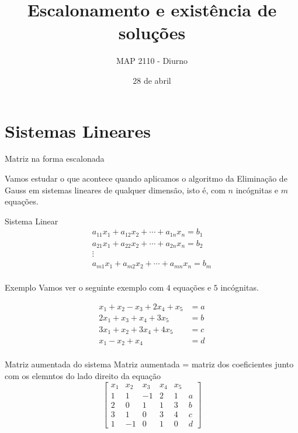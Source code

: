 \documentclass{beamer}
\title[Escalonamento]{Escalonamento e existência de soluções}
\author{MAP 2110 - Diurno}
\institute{IME USP}
\date{28 de abril}
\begin{document}
\begin{frame}
  \titlepage
\end{frame}



\section{Sistemas Lineares}

\begin{frame}{Matriz na forma escalonada}

 Vamos estudar o que acontece quando aplicamos o algoritmo da Eliminação de Gauss em sistemas
 lineares de qualquer dimensão, isto é, com $n$ incógnitas e $m$ equações.
   \begin{block}{Sistema Linear}
     \begin{gather*}
      a_{11}x_1 + a_{12}x_2 + \cdots + a_{1n}x_n = b_1 \\
      a_{21}x_1 + a_{22}x_2 + \cdots + a_{2n}x_n = b_2 \\
      \vdots \\
      a_{m1}x_1 + a_{m2}x_2 + \cdots + a_{mn}x_n = b_m \\
    \end{gather*}
  \end{block}
\end{frame}

\begin{frame}{Exemplo}
  Vamos ver o seguinte exemplo com $4$ equações e $5$ incógnitas.

  \begin{align*}
    x_1 + x_2 - x_3 + 2x_4 +x_5 &= a \\
    2x_1 +  x_3 + x_4 +3x_5 &= b \\
    3x_1 + x_2  + 3x_4 +4x_5 &= c \\
    x_1 -x_2 + x_4  &= d\\
  \end{align*}
  
\end{frame}

\begin{frame}{Matriz aumentada do sistema}
  Matriz aumentada = matriz dos coeficientes junto com os elemntos do lado direito da equação
$$
 \left[ \begin{array}{ccccc|c}
    x_1 & x_2 & x_3 & x_4 & x_5 & \\ \hline
    1 & 1 & -1 & 2 & 1 & a \\ 
    2 & 0 & 1 &1 & 3 & b \\
    3 & 1 & 0 & 3 & 4 & c \\
    1 & -1 & 0 & 1 & 0 & d
    \end{array}\right]
$$
  

\end{frame}
\end{document}

